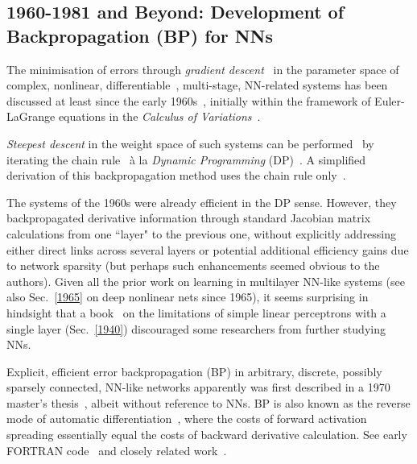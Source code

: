 \documentclass[letterpaper]{article}
\begin{document}
\begin{CJK*}{UTF8}{gbsn}
\subsection{1960-1981 and Beyond: Development of Backpropagation (BP) for NNs}
\label{1970}
The minimisation of  
errors through {\em gradient descent}~\citep{hadamard1908memoire} in
the parameter space of complex, 
nonlinear, differentiable~\citep{leibniz1684}, multi-stage, NN-related systems has been discussed 
at least since the early 1960s~\citep[e.g.,][]{Kelley:1960,bryson:1961,BRYSON-DENHAM-61A,PONTRYAGIN61A,dreyfus:1962,Wilkinson:1965,Amari:1967:TAP,bryson1969applied,director:1969},
initially within the framework of Euler-LaGrange equations in the {\em Calculus of Variations}~\citep[e.g.,][]{Euler:1744}.

{\em Steepest descent} in the weight space of 
such systems can be performed~\citep{bryson:1961,Kelley:1960,bryson1969applied} 
by iterating the chain rule~\citep{leibniz:1676,de1716analyse} 
\`{a} la {\em Dynamic Programming} (DP)~\citep{Bellman:1957}.
A simplified derivation of this backpropagation method uses the chain rule only~\citep{dreyfus:1962}.

The systems of the 1960s were already efficient in the DP sense.
However, they backpropagated derivative information through
standard Jacobian matrix calculations from one ``layer" to the previous one,
without explicitly addressing either direct links across several layers or potential additional efficiency gains due to network sparsity 
(but perhaps such enhancements seemed obvious to the authors).
Given all the prior work on learning in multilayer NN-like systems (see also Sec.~\ref{1965}
on deep nonlinear nets since 1965),
it seems surprising in hindsight that a book~\citep{MinskyPapert:69} 
on the limitations of simple linear 
perceptrons with a single layer (Sec.~\ref{1940})
discouraged some researchers from further studying NNs.


Explicit, efficient error backpropagation (BP) in arbitrary, discrete, possibly sparsely connected, 
NN-like networks apparently was first described 
 in a 1970 master's thesis~\citep{Linnainmaa:1970,Linnainmaa:1976}, albeit without reference to NNs.
BP is also known as the reverse mode of automatic differentiation~\citep{Griewank:2012}, 
where the costs of forward activation spreading essentially equal the costs of backward 
derivative calculation. 
See early FORTRAN code~\citep{Linnainmaa:1970} and closely related work~\citep{ostrovskii:1971}.


\end{CJK*}
\end{document}
